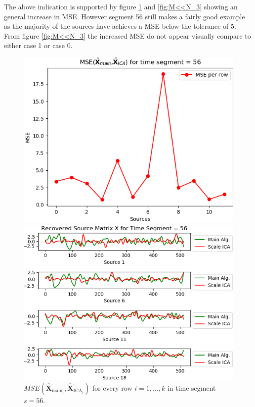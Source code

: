 \noindent 
The above indication is supported by figure \ref{fig:M<<N_2} and \ref{fig:M<<N_3} showing an general increase in MSE. However segment 56 still makes a fairly good example as the majority of the sources have achieves a MSE below the tolerance of 5. From figure \ref{fig:M<<N_3} the increased MSE do not appear visually compare to either case 1 or case 0.        
\begin{figure}[H]
\begin{widepage}
    \begin{minipage}[t]{.49\textwidth}
\centering
\includegraphics[width=1\linewidth]{figures/ch_7/mse_second_removed_ica_timeseg55_kopi.png}
\caption{$MSE\left(\hat{\mathbf{X}}_{\text{main}_{i}},\hat{\mathbf{X}}_{\text{ICA}_{i}}\right)$ for every row $i = 1, \hdots, k$ in time segment $s=56$.}
\label{fig:M<<N_2}
\end{minipage} 
\hspace{.5cm}
\begin{minipage}[t]{.49\textwidth}
\centering
\includegraphics[width=1\linewidth]{figures/ch_7/EEG_second_removed_scaled_timeseg55S1_CClean_kopi.png}

\end{minipage}
\end{widepage}
\end{figure}
